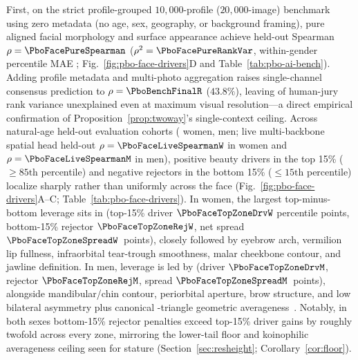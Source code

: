 First, on the strict profile-grouped $10{,}000$-profile ($20{,}000$-image) benchmark using zero metadata (no age, sex,
geography, or background framing), pure aligned facial morphology and surface appearance achieve held-out Spearman
$\rho=\PboFacePureSpearman$ ($\rho^2=\PboFacePureRankVar$, within-gender percentile MAE \PboFacePurePctMae;
Fig.~\ref{fig:pbo-face-drivers}D and Table~\ref{tab:pbo-ai-bench}). Adding profile metadata and multi-photo aggregation
raises single-channel consensus prediction to $\rho=\PboBenchFinalR$ ($43.8\%$), leaving \PboBenchUnexplainedPct{} of
human-jury rank variance unexplained even at maximum visual resolution---a direct empirical confirmation of
Proposition~\ref{prop:twoway}'s single-context ceiling. Across natural-age held-out evaluation cohorts (\PboFaceEvalNatW{}
women, \PboFaceEvalNatM{} men; live multi-backbone spatial head held-out $\rho=\PboFaceLiveSpearmanW$ in women and
$\rho=\PboFaceLiveSpearmanM$ in men), positive beauty drivers in the top 15\% ($\ge 85\text{th}$ percentile) and negative
rejectors in the bottom 15\% ($\le 15\text{th}$ percentile) localize sharply rather than uniformly across the face
(Fig.~\ref{fig:pbo-face-drivers}A--C; Table~\ref{tab:pbo-face-drivers}). In women, the largest top-minus-bottom leverage sits
in \PboFaceTopZoneNameW{} (top-15\% driver $\PboFaceTopZoneDrvW$ percentile points, bottom-15\% rejector
$\PboFaceTopZoneRejW$, net spread $\PboFaceTopZoneSpreadW$~points), closely followed by eyebrow arch, vermilion lip fullness,
infraorbital tear-trough smoothness, malar cheekbone contour, and jawline definition. In men, leverage is led by
\PboFaceTopZoneNameM{} (driver $\PboFaceTopZoneDrvM$, rejector $\PboFaceTopZoneRejM$, spread $\PboFaceTopZoneSpreadM$~points),
alongside mandibular/chin contour, periorbital aperture, brow structure, and low bilateral asymmetry plus canonical
\PboFaceTrisN-triangle geometric averageness~\cite{langlois1990,rhodes2006,little2011}. Notably, in both sexes bottom-15\%
rejector penalties exceed top-15\% driver gains by roughly twofold across every zone, mirroring the lower-tail floor and
koinophilic averageness ceiling seen for stature (Section~\ref{sec:resheight}; Corollary~\ref{cor:floor}).

